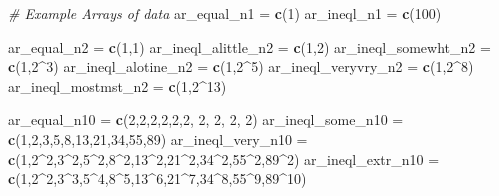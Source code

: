 \documentclass[
]{book}
\newenvironment{Shaded}{\begin{snugshade}}{\end{snugshade}}
\newcommand{\CommentTok}[1]{\textcolor[rgb]{0.56,0.35,0.01}{\textit{#1}}}
\newcommand{\DecValTok}[1]{\textcolor[rgb]{0.00,0.00,0.81}{#1}}
\newcommand{\KeywordTok}[1]{\textcolor[rgb]{0.13,0.29,0.53}{\textbf{#1}}}
\newcommand{\NormalTok}[1]{#1}
\newcommand{\OperatorTok}[1]{\textcolor[rgb]{0.81,0.36,0.00}{\textbf{#1}}}
\newcommand{\StringTok}[1]{\textcolor[rgb]{0.31,0.60,0.02}{#1}}
\begin{document}
\begin{Shaded}
\begin{Highlighting}[]
\CommentTok{# Example Arrays of data}
\NormalTok{ar_equal_n1 =}\StringTok{ }\KeywordTok{c}\NormalTok{(}\DecValTok{1}\NormalTok{)}
\NormalTok{ar_ineql_n1 =}\StringTok{ }\KeywordTok{c}\NormalTok{(}\DecValTok{100}\NormalTok{)}

\NormalTok{ar_equal_n2 =}\StringTok{ }\KeywordTok{c}\NormalTok{(}\DecValTok{1}\NormalTok{,}\DecValTok{1}\NormalTok{)}
\NormalTok{ar_ineql_alittle_n2 =}\StringTok{ }\KeywordTok{c}\NormalTok{(}\DecValTok{1}\NormalTok{,}\DecValTok{2}\NormalTok{)}
\NormalTok{ar_ineql_somewht_n2 =}\StringTok{ }\KeywordTok{c}\NormalTok{(}\DecValTok{1}\NormalTok{,}\DecValTok{2}\OperatorTok{^}\DecValTok{3}\NormalTok{)}
\NormalTok{ar_ineql_alotine_n2 =}\StringTok{ }\KeywordTok{c}\NormalTok{(}\DecValTok{1}\NormalTok{,}\DecValTok{2}\OperatorTok{^}\DecValTok{5}\NormalTok{)}
\NormalTok{ar_ineql_veryvry_n2 =}\StringTok{ }\KeywordTok{c}\NormalTok{(}\DecValTok{1}\NormalTok{,}\DecValTok{2}\OperatorTok{^}\DecValTok{8}\NormalTok{)}
\NormalTok{ar_ineql_mostmst_n2 =}\StringTok{ }\KeywordTok{c}\NormalTok{(}\DecValTok{1}\NormalTok{,}\DecValTok{2}\OperatorTok{^}\DecValTok{13}\NormalTok{)}

\NormalTok{ar_equal_n10 =}\StringTok{ }\KeywordTok{c}\NormalTok{(}\DecValTok{2}\NormalTok{,}\DecValTok{2}\NormalTok{,}\DecValTok{2}\NormalTok{,}\DecValTok{2}\NormalTok{,}\DecValTok{2}\NormalTok{,}\DecValTok{2}\NormalTok{, }\DecValTok{2}\NormalTok{, }\DecValTok{2}\NormalTok{, }\DecValTok{2}\NormalTok{, }\DecValTok{2}\NormalTok{)}
\NormalTok{ar_ineql_some_n10 =}\StringTok{ }\KeywordTok{c}\NormalTok{(}\DecValTok{1}\NormalTok{,}\DecValTok{2}\NormalTok{,}\DecValTok{3}\NormalTok{,}\DecValTok{5}\NormalTok{,}\DecValTok{8}\NormalTok{,}\DecValTok{13}\NormalTok{,}\DecValTok{21}\NormalTok{,}\DecValTok{34}\NormalTok{,}\DecValTok{55}\NormalTok{,}\DecValTok{89}\NormalTok{)}
\NormalTok{ar_ineql_very_n10 =}\StringTok{ }\KeywordTok{c}\NormalTok{(}\DecValTok{1}\NormalTok{,}\DecValTok{2}\OperatorTok{^}\DecValTok{2}\NormalTok{,}\DecValTok{3}\OperatorTok{^}\DecValTok{2}\NormalTok{,}\DecValTok{5}\OperatorTok{^}\DecValTok{2}\NormalTok{,}\DecValTok{8}\OperatorTok{^}\DecValTok{2}\NormalTok{,}\DecValTok{13}\OperatorTok{^}\DecValTok{2}\NormalTok{,}\DecValTok{21}\OperatorTok{^}\DecValTok{2}\NormalTok{,}\DecValTok{34}\OperatorTok{^}\DecValTok{2}\NormalTok{,}\DecValTok{55}\OperatorTok{^}\DecValTok{2}\NormalTok{,}\DecValTok{89}\OperatorTok{^}\DecValTok{2}\NormalTok{)}
\NormalTok{ar_ineql_extr_n10 =}\StringTok{ }\KeywordTok{c}\NormalTok{(}\DecValTok{1}\NormalTok{,}\DecValTok{2}\OperatorTok{^}\DecValTok{2}\NormalTok{,}\DecValTok{3}\OperatorTok{^}\DecValTok{3}\NormalTok{,}\DecValTok{5}\OperatorTok{^}\DecValTok{4}\NormalTok{,}\DecValTok{8}\OperatorTok{^}\DecValTok{5}\NormalTok{,}\DecValTok{13}\OperatorTok{^}\DecValTok{6}\NormalTok{,}\DecValTok{21}\OperatorTok{^}\DecValTok{7}\NormalTok{,}\DecValTok{34}\OperatorTok{^}\DecValTok{8}\NormalTok{,}\DecValTok{55}\OperatorTok{^}\DecValTok{9}\NormalTok{,}\DecValTok{89}\OperatorTok{^}\DecValTok{10}\NormalTok{)}
\end{Highlighting}
\end{Shaded}
\end{document}
